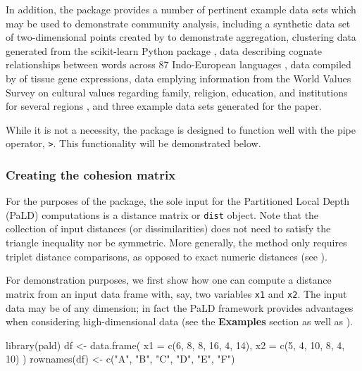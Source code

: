 In addition, the package provides a number of pertinent example data
sets which may be used to demonstrate community analysis, including a
synthetic data set of two-dimensional points created by
\citet{gionis1clustering} to demonstrate aggregation, clustering data
generated from the scikit-learn Python package
\citep{pedregosa2011scikit}, data describing cognate relationships
between words across 87 Indo-European languages \citep{dyen92}, data
compiled by \cite{tissue} of tissue gene expressions, data emplying
information from the World Values Survey \citep{inglehart2014world} on
cultural values regarding family, religion, education, and institutions
for several regions \citep{muthukrishna2020beyond}, and three example
data sets generated for the \citet{berenhaut2022social} paper.

While it is not a necessity, the  package is designed to
function well with the pipe operator, \texttt{\textbar{}\textgreater{}}.
This functionality will be demonstrated below.

\hypertarget{creating-the-cohesion-matrix}{%
\subsubsection{Creating the cohesion
matrix}\label{creating-the-cohesion-matrix}}

For the purposes of the  package, the sole input for the
Partitioned Local Depth (PaLD) computations is a distance matrix or
\texttt{dist} object. Note that the collection of input distances (or
dissimilarities) does not need to satisfy the triangle inequality nor be
symmetric. More generally, the method only requires triplet distance
comparisons, as opposed to exact numeric distances (see
\citet{berenhaut2022social}).

For demonstration purposes, we first show how one can compute a distance
matrix from an input data frame with, say, two variables \texttt{x1} and
\texttt{x2}. The input data may be of any dimension; in fact the PaLD
framework provides advantages when considering high-dimensional data
(see the \textbf{Examples} section as well as
\citet{berenhaut2022social}).

\begin{Schunk}
\begin{Sinput}
library(pald)
df <- data.frame(
  x1 = c(6, 8, 8, 16, 4, 14),
  x2 = c(5, 4, 10, 8, 4, 10)
)
rownames(df) <- c("A", "B", "C", "D", "E", "F")
\end{Sinput}
\end{Schunk}

